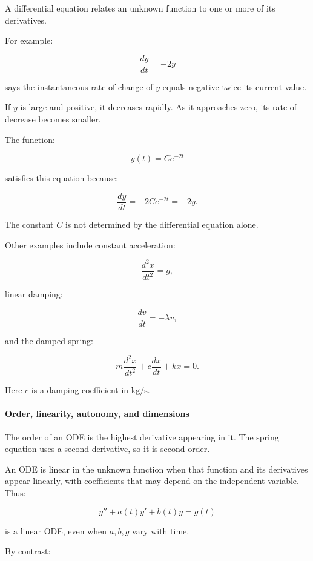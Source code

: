 \hypertarget{02-foundations-ii-ch022-what-makes-an-equation-differential}{}

A differential equation relates an unknown function to one or more of its derivatives.

For example:

\[
\frac{dy}{dt}=-2y
\]

says the instantaneous rate of change of \(y\) equals negative twice its current value.

If \(y\) is large and positive, it decreases rapidly. As it approaches zero, its rate of decrease becomes smaller.

The function:

\[
y(t)=Ce^{-2t}
\]

satisfies this equation because:

\[
\frac{dy}{dt}=-2Ce^{-2t}=-2y.
\]

The constant \(C\) is not determined by the differential equation alone.

Other examples include constant acceleration:

\[
\frac{d^2x}{dt^2}=g,
\]

linear damping:

\[
\frac{dv}{dt}=-\lambda v,
\]

and the damped spring:

\[
m\frac{d^2x}{dt^2}+c\frac{dx}{dt}+kx=0.
\]

Here \(c\) is a damping coefficient in \(\mathrm{kg/s}\).

\paragraph{Order, linearity, autonomy, and dimensions}\label{02-foundations-ii-ch022-order-linearity-autonomy-and-dimensions}

\hypertarget{02-foundations-ii-ch022-order-linearity-autonomy-and-dimensions}{}

The order of an ODE is the highest derivative appearing in it. The spring equation uses a second derivative, so it is second-order.

An ODE is linear in the unknown function when that function and its derivatives appear linearly, with coefficients that may depend on the independent variable. Thus:

\[
y''+a(t)y'+b(t)y=g(t)
\]

is a linear ODE, even when \(a,b,g\) vary with time.

By contrast:

